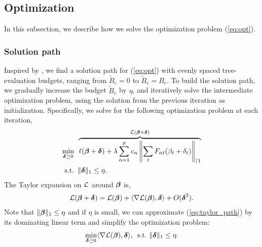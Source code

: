 \subsection{Optimization}
In this subsection, we describe how we solve the optimization problem (\ref{eq:opt}).

\subsubsection{Solution path}
Inspired by \citet{rosset2004boosting}, we find a solution path for (\ref{eq:opt}) with evenly spaced tree-evaluation budgets, ranging from $\tilde{B}_e = 0$ to $\tilde{B}_e = B_e$. To build the solution path, we gradually increase the budget $\tilde{B}_e$ by $\eta$, and iteratively solve the intermediate optimization problem, using the solution from the previous iteration as initialization. Specifically, we solve for the following optimization problem at each iteration,
\begin{align}
	\min_{\boldsymbol{\delta}\geq 0} & \hspace{5pt} \overbrace{\ell(\boldsymbol{\beta} + {\boldsymbol{\delta}}) + \lambda \sum_{\alpha=1}^p c_{\alpha} \left\|\sum_t F_{\alpha t} (\beta_t + \delta_t)\right\|_{\lceil 1}}^{\cal L(\boldsymbol{\beta} + \boldsymbol{\delta})} \label{eq:replace}\\
	\textrm{s.t.} & \hspace{5pt} \|\boldsymbol{\delta}\|_1 \le \eta. \nonumber	
\end{align} 
The Taylor expansion on ${\cal L}$ around $\boldsymbol{\beta}$ is,
\begin{align}
	{\cal L}({\boldsymbol{\beta}} + {\boldsymbol{\delta}}) = {\cal L}({\boldsymbol{\beta}}) + 	\langle\nabla {\cal L}(\boldsymbol{\beta}), \boldsymbol{\delta} \rangle + O(\boldsymbol{\delta}^2). \label{eq:taylor_path}
\end{align}
Note that $\|\boldsymbol{\beta}\|_1 \le \eta$ and if $\eta$ is small, we can approximate (\ref{eq:taylor_path}) by its dominating linear term and simplify the optimization problem:
\begin{align}
	\min_{\boldsymbol{\delta}\geq 0} \langle \nabla{\cal L}(\boldsymbol{\beta}), \boldsymbol{\delta} \rangle, \hspace{5pt} \textrm{s.t.}~\|\boldsymbol{\delta}\|_1 \le \eta. \label{eq:linear_optimization}
\end{align}

